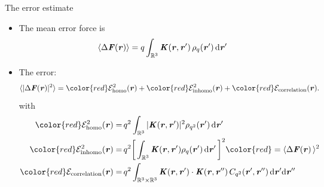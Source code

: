 \documentclass{beamer}
\newcommand{\redc}[1]{{\color{red} #1}}
\newcommand{\bluec}[1]{{\color{blue} #1}}
\renewcommand{\v}[1]{\textbf{\textit{#1}}}
\renewcommand{\d}[1]{\textrm{#1}}
\begin{document}
\begin{frame}{The error estimate}
  \begin{itemize}\itemsep -10pt
  \item<1->   The mean error force is
    \bluec{
      \begin{align*}
        \langle\Delta\v F(\v r)\rangle
        =
        q\int_{\mathbb R^3}\v K(\v r , \v r')\,\rho_q(\v r')\,\d d\v r'
      \end{align*}
    }
  \vskip -10cm
\item<2->   The error:
  \bluec{
    \begin{align*} \nonumber
      \langle\vert\Delta\v F(\v r)\vert^2\rangle
      = 
      \redc{\mathcal E^2_{\textrm{homo}}(\v r)} +
      \redc{\mathcal E^2_{\textrm{inhomo}}(\v r)} +
      \redc{\mathcal E_{\textrm{correlation}}(\v r)}.
    \end{align*}
  }
  with\bluec{
  \begin{align*}
    \redc{\mathcal E^2_{\textrm{homo}}(\v r)}
    = &\,
    q^2\int_{\mathbb R^3}\vert\v K(\v r, \v r')\vert^2\rho_{q^2}(\v r')\,\d d\v r'  \\
    \redc{\mathcal E^2_{\textrm{inhomo}}(\v r)}
    = &\,
    q^2\bigg[\int_{\mathbb R^3}\v K(\v r, \v r')\rho_q(\v r')\,\d d\v r'\,\bigg]^2
    \redc{ = \langle\Delta\v F(\v r)\,\rangle^2}
    \\
    \redc{\mathcal E_{\textrm{correlation}}(\v r)}
    =&\,
    q^2\int_{\mathbb R^3\times\mathbb R^3}\v K(\v r, \v r')\cdot\v K(\v r, \v r'')\,C_{q^2}(\v r', \v r'')\,\d d\v r'\d d\v r''
  \end{align*}}
  \end{itemize}
\end{frame}
\end{document}
